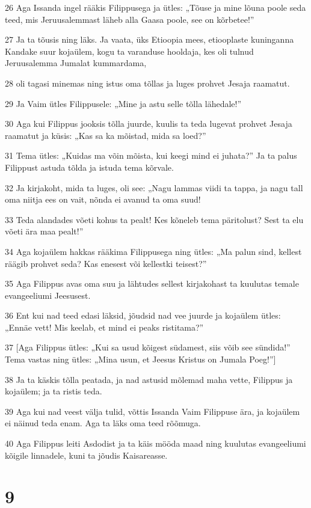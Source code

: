 \par 26 Aga Issanda ingel rääkis Filippusega ja ütles: „Tõuse ja mine lõuna poole seda teed, mis Jeruusalemmast läheb alla Gaasa poole, see on kõrbetee!”
\par 27 Ja ta tõusis ning läks. Ja vaata, üks Etioopia mees, etiooplaste kuninganna Kandake suur kojaülem, kogu ta varanduse hooldaja, kes oli tulnud Jeruusalemma Jumalat kummardama,
\par 28 oli tagasi minemas ning istus oma tõllas ja luges prohvet Jesaja raamatut.
\par 29 Ja Vaim ütles Filippusele: „Mine ja astu selle tõlla lähedale!”
\par 30 Aga kui Filippus jooksis tõlla juurde, kuulis ta teda lugevat prohvet Jesaja raamatut ja küsis: „Kas sa ka mõistad, mida sa loed?”
\par 31 Tema ütles: „Kuidas ma võin mõista, kui keegi mind ei juhata?” Ja ta palus Filippust astuda tõlda ja istuda tema kõrvale.
\par 32 Ja kirjakoht, mida ta luges, oli see: „Nagu lammas viidi ta tappa, ja nagu tall oma niitja ees on vait, nõnda ei avanud ta oma suud!
\par 33 Teda alandades võeti kohus ta pealt! Kes kõneleb tema päritolust? Sest ta elu võeti ära maa pealt!”
\par 34 Aga kojaülem hakkas rääkima Filippusega ning ütles: „Ma palun sind, kellest räägib prohvet seda? Kas enesest või kellestki teisest?”
\par 35 Aga Filippus avas oma suu ja lähtudes sellest kirjakohast ta kuulutas temale evangeeliumi Jeesusest.
\par 36 Ent kui nad teed edasi läksid, jõudsid nad vee juurde ja kojaülem ütles: „Ennäe vett! Mis keelab, et mind ei peaks ristitama?”
\par 37 [Aga Filippus ütles: „Kui sa usud kõigest südamest, siis võib see sündida!” Tema vastas ning ütles: „Mina usun, et Jeesus Kristus on Jumala Poeg!”]
\par 38 Ja ta käskis tõlla peatada, ja nad astusid mõlemad maha vette, Filippus ja kojaülem; ja ta ristis teda.
\par 39 Aga kui nad veest välja tulid, võttis Issanda Vaim Filippuse ära, ja kojaülem ei näinud teda enam. Aga ta läks oma teed rõõmuga.
\par 40 Aga Filippus leiti Asdodist ja ta käis mööda maad ning kuulutas evangeeliumi kõigile linnadele, kuni ta jõudis Kaisareasse.


\chapter{9}

